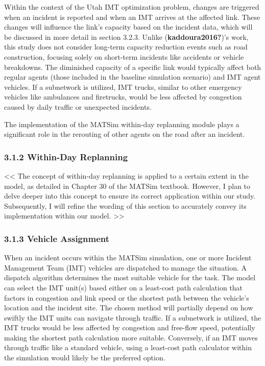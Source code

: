 \documentclass[
  letterpaper,
  DIV=11,
  numbers=noendperiod]{scrreprt}
\begin{document}
Within the context of the Utah IMT optimization problem, changes are
triggered when an incident is reported and when an IMT arrives at the
affected link. These changes will influence the link's capacity based on
the incident data, which will be discussed in more detail in section
3.2.3. Unlike (\textbf{kaddoura2016?})'s work, this study does not
consider long-term capacity reduction events such as road construction,
focusing solely on short-term incidents like accidents or vehicle
breakdowns. The diminished capacity of a specific link would typically
affect both regular agents (those included in the baseline simulation
scenario) and IMT agent vehicles. If a subnetwork is utilized, IMT
trucks, similar to other emergency vehicles like ambulances and
firetrucks, would be less affected by congestion caused by daily traffic
or unexpected incidents.

The implementation of the MATSim within-day replanning module plays a
significant role in the rerouting of other agents on the road after an
incident.

\hypertarget{within-day-replanning}{%
\subsubsection{3.1.2 Within-Day
Replanning}\label{within-day-replanning}}

\textless\textless{} The concept of within-day replanning is applied to
a certain extent in the model, as detailed in Chapter 30 of the MATSim
textbook. However, I plan to delve deeper into this concept to ensure
its correct application within our study. Subsequently, I will refine
the wording of this section to accurately convey its implementation
within our model. \textgreater\textgreater{}

\hypertarget{vehicle-assignment}{%
\subsubsection{3.1.3 Vehicle Assignment}\label{vehicle-assignment}}

When an incident occurs within the MATSim simulation, one or more
Incident Management Team (IMT) vehicles are dispatched to manage the
situation. A dispatch algorithm determines the most suitable vehicle for
the task. The model can select the IMT unit(s) based either on a
least-cost path calculation that factors in congestion and link speed or
the shortest path between the vehicle's location and the incident site.
The chosen method will partially depend on how swiftly the IMT units can
navigate through traffic. If a subnetwork is utilized, the IMT trucks
would be less affected by congestion and free-flow speed, potentially
making the shortest path calculation more suitable. Conversely, if an
IMT moves through traffic like a standard vehicle, using a least-cost
path calculator within the simulation would likely be the preferred
option.
\end{document}
